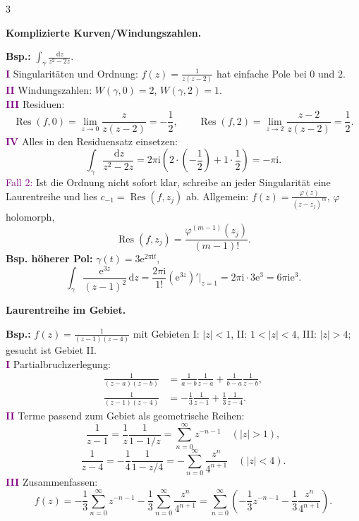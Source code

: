 \documentclass[a4paper,landscape]{article}
\newcommand{\dd}{\,\mathrm d}
\newcommand{\ee}{\mathrm e}
\newcommand{\ii}{\mathrm i}
\DeclareMathOperator{\Res}{Res}
\newcommand{\KR}[1]{\textcolor{purple}{\textbf{#1}}}
\newcommand{\themenzeile}[1]{%
  \par\smallskip
  \begingroup
  \setlength{\fboxsep}{0.7mm}%
  \noindent\colorbox{themenrahmen}{%
    \parbox{\dimexpr\linewidth-2\fboxsep\relax}{\color{white}\bfseries #1}}%
  \endgroup
  \par\nobreak\smallskip\nobreak
}
\begin{document}
\begin{multicols*}{3}
\themenzeile{Komplizierte Kurven/Windungszahlen.}
\textbf{Bsp.:} $\int_\gamma \frac{\dd z}{z^2-2z}$.\\[-0.2mm]
\KR{I} Singularitäten und Ordnung: $f(z)=\frac1{z(z-2)}$ hat einfache Pole bei $0$ und $2$.\\[-0.2mm]
\KR{II} Windungszahlen: $W(\gamma,0)=2$, $W(\gamma,2)=1$.\\[-0.2mm]
\KR{III} Residuen:
\[
\Res(f,0)=\lim_{z\to0}\frac{z}{z(z-2)}=-\frac12,
\qquad
\Res(f,2)=\lim_{z\to2}\frac{z-2}{z(z-2)}=\frac12.
\]
\KR{IV} Alles in den Residuensatz einsetzen:
\[
\int_\gamma\frac{\dd z}{z^2-2z}=2\pi\ii\left(2\cdot\left(-\frac12\right)+1\cdot\frac12\right)=-\pi\ii.
\]
\textcolor{purple}{Fall 2:} Ist die Ordnung nicht sofort klar, schreibe an jeder Singularität eine Laurentreihe und lies $c_{-1}=\Res(f,z_j)$ ab. Allgemein: $f(z)=\frac{\varphi(z)}{(z-z_j)^m}$, $\varphi$ holomorph,
\[
\Res(f,z_j)=\frac{\varphi^{(m-1)}(z_j)}{(m-1)!}.
\]
\textbf{Bsp. höherer Pol:} $\gamma(t)=3\ee^{2\pi\ii t}$,
\[
\int_\gamma\frac{\ee^{3z}}{(z-1)^2}\dd z
=\frac{2\pi\ii}{1!}(\ee^{3z})'\big|_{z=1}
=2\pi\ii\cdot3\ee^3=6\pi\ii\ee^3.
\]

\themenzeile{Laurentreihe im Gebiet.}
\textbf{Bsp.:} $f(z)=\frac1{(z-1)(z-4)}$ mit Gebieten
I: $|z|<1$, II: $1<|z|<4$, III: $|z|>4$; gesucht ist Gebiet II.\\[-0.2mm]
\KR{I} Partialbruchzerlegung:
\[
\begin{aligned}
\frac1{(z-a)(z-b)}
&=\frac1{a-b}\frac1{z-a}+\frac1{b-a}\frac1{z-b},\\
\frac1{(z-1)(z-4)}
&=-\frac13\frac1{z-1}+\frac13\frac1{z-4}.
\end{aligned}
\]
\KR{II} Terme passend zum Gebiet als geometrische Reihen:
\[
\frac1{z-1}=\frac1z\frac1{1-1/z}=\sum_{n=0}^\infty z^{-n-1}\quad(|z|>1),
\]
\[
\frac1{z-4}=-\frac14\frac1{1-z/4}=-\sum_{n=0}^\infty\frac{z^n}{4^{n+1}}\quad(|z|<4).
\]
\KR{III} Zusammenfassen:
\[
f(z)=-\frac13\sum_{n=0}^\infty z^{-n-1}-\frac13\sum_{n=0}^\infty\frac{z^n}{4^{n+1}}
=\sum_{n=0}^\infty\left(-\frac13z^{-n-1}-\frac13\frac{z^n}{4^{n+1}}\right).
\]


\end{multicols*}
\end{document}
